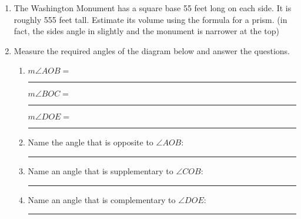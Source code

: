 \documentclass[12pt, twoside]{article}
\begin{document}
\begin{enumerate}
\newpage
\item The Washington Monument has a square base 55 feet long on each side. It is roughly 555 feet tall. Estimate its volume using the formula for a prism. (in fact, the sides angle in slightly and the monument is narrower at the top)  \vspace{7cm}  

\item Measure the required angles of the diagram below and answer the questions. \vspace{0.25cm}
  \begin{enumerate}
    \item  $m \angle AOB = $ \rule{2.5cm}{0.15mm} \hspace{0.5cm} $m \angle BOC = $ \rule{2.5cm}{0.15mm} \hspace{0.5cm} $m \angle DOE = $ \rule{2.5cm}{0.15mm}\bigskip
    \item Name the angle that is opposite to $\angle AOB$: \rule{4cm}{0.15mm}  \bigskip
    \item Name an angle that is supplementary to $\angle COB$: \rule{4cm}{0.15mm} \bigskip
    \item Name an angle that is complementary to $\angle DOE$: \rule{4cm}{0.15mm}
  \end{enumerate}
  \vspace{1cm}
  \begin{center}
  \end{center}

  \newpage

\end{enumerate}
\end{document}
